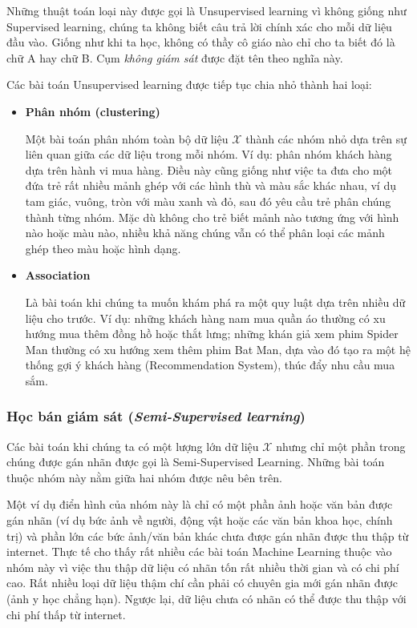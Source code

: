 \documentclass[../main-report.tex]{subfiles}
\begin{document}
Những thuật toán loại này được gọi là Unsupervised learning vì không giống như Supervised learning, chúng ta không biết câu trả lời chính xác cho mỗi dữ liệu đầu vào. Giống như khi ta học, không có thầy cô giáo nào chỉ cho ta biết đó là chữ A hay chữ B. Cụm \emph{không giám sát} được đặt tên theo nghĩa này.

Các bài toán Unsupervised learning được tiếp tục chia nhỏ thành hai loại:

\begin{itemize}
\item \textbf{Phân nhóm (clustering)}

Một bài toán phân nhóm toàn bộ dữ liệu \(\mathcal{X}\) thành các nhóm nhỏ dựa trên sự liên quan giữa các dữ liệu trong mỗi nhóm. Ví dụ: phân nhóm khách hàng dựa trên hành vi mua hàng. Điều này cũng giống như việc ta đưa cho một đứa trẻ rất nhiều mảnh ghép với các hình thù và màu sắc khác nhau, ví dụ tam giác, vuông, tròn với màu xanh và đỏ, sau đó yêu cầu trẻ phân chúng thành từng nhóm. Mặc dù không cho trẻ biết mảnh nào tương ứng với hình nào hoặc màu nào, nhiều khả năng chúng vẫn có thể phân loại các mảnh ghép theo màu hoặc hình dạng.

\item \textbf{Association}

Là bài toán khi chúng ta muốn khám phá ra một quy luật dựa trên nhiều dữ liệu cho trước. Ví dụ: những khách hàng nam mua quần áo thường có xu hướng mua thêm đồng hồ hoặc thắt lưng; những khán giả xem phim Spider Man thường có xu hướng xem thêm phim Bat Man, dựa vào đó tạo ra một hệ thống gợi ý khách hàng (Recommendation System), thúc đẩy nhu cầu mua sắm.
\end{itemize}

\subsubsection*{Học bán giám sát (\emph{Semi-Supervised learning})}
Các bài toán khi chúng ta có một lượng lớn dữ liệu \(\mathcal{X}\) nhưng chỉ một phần trong chúng được gán nhãn được gọi là Semi-Supervised Learning. Những bài toán thuộc nhóm này nằm giữa hai nhóm được nêu bên trên.

Một ví dụ điển hình của nhóm này là chỉ có một phần ảnh hoặc văn bản được gán nhãn (ví dụ bức ảnh về người, động vật hoặc các văn bản khoa học, chính trị) và phần lớn các bức ảnh/văn bản khác chưa được gán nhãn được thu thập từ internet. Thực tế cho thấy rất nhiều các bài toán Machine Learning thuộc vào nhóm này vì việc thu thập dữ liệu có nhãn tốn rất nhiều thời gian và có chi phí cao. Rất nhiều loại dữ liệu thậm chí cần phải có chuyên gia mới gán nhãn được (ảnh y học chẳng hạn). Ngược lại, dữ liệu chưa có nhãn có thể được thu thập với chi phí thấp từ internet.
\end{document}
